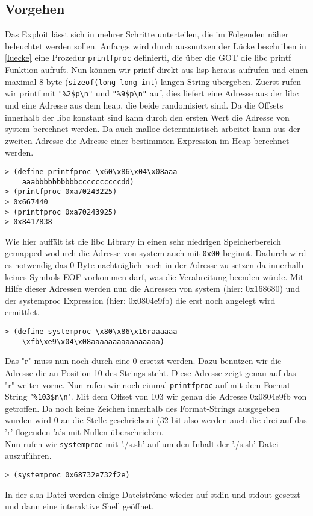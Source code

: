 \subsection{Vorgehen}
Das Exploit lässt sich in mehrer Schritte unterteilen, die im Folgenden näher beleuchtet werden sollen. Anfangs wird durch aussnutzen der Lücke beschriben in \ref{luecke} eine Prozedur \texttt{printfproc} definierti, die über die GOT die libc printf Funktion aufruft. Nun können wir printf direkt aus lisp heraus aufrufen und einen maximal 8 byte (\texttt{sizeof(long long int}) langen String übergeben.
 Zuerst rufen wir printf mit \texttt{"\%2\$p\textbackslash n"} und \texttt{"\%9\$p\textbackslash n"} auf, dies liefert eine Adresse aus der libc und eine Adresse aus dem heap, die beide randomisiert sind. 
Da die Offsets innerhalb der libc konstant sind kann durch den ersten Wert die Adresse von system berechnet werden. Da auch malloc deterministisch arbeitet kann aus der zweiten Adresse die Adresse einer bestimmten Expression im Heap berechnet werden.
\begin{lstlisting}
> (define printfproc \x60\x86\x04\x08aaa
	aaabbbbbbbbbbccccccccccdd)
> (printfproc 0xa70243225)
> 0x667440
> (printfproc 0xa70243925)
> 0x8417838
\end{lstlisting}
Wie hier auffält ist die libc Library in einen sehr niedrigen Speicherbereich gemapped wodurch die Adresse von system auch mit  \texttt{0x00} beginnt. Dadurch wird es notwendig das 0 Byte nachträglich noch in der Adresse zu setzen da innerhalb keines Symbols EOF vorkommen darf, was die Verabreitung beenden würde.
Mit Hilfe dieser Adressen werden nun die Adressen von system (hier: 0x168680) und der systemproc Expression (hier: 0x0804e9fb) die erst noch angelegt wird ermittlet.
\begin{lstlisting}
> (define systemproc \x80\x86\x16raaaaaa
	\xfb\xe9\x04\x08aaaaaaaaaaaaaaaa)
\end{lstlisting}
Das "r" muss nun noch durch eine 0 ersetzt werden. 
Dazu benutzen wir die Adresse die an Position 10 des Strings steht. 
Diese Adresse zeigt genau auf das "r" weiter vorne. 
Nun rufen wir noch einmal \texttt{printfproc} auf mit dem Format-String "\texttt{\%103\$n\textbackslash n}". Mit dem Offset von 103 wir genau die Adresse 0x0804e9fb von getroffen. Da noch keine Zeichen innerhalb des Format-Strings ausgegeben wurden wird 0 an die Stelle geschriebeni (32 bit also werden auch die drei auf das 'r' flogenden 'a's mit Nullen überschrieben.
\\
Nun rufen wir \texttt{systemproc} mit './s.sh' auf um den Inhalt der './s.sh' Datei auszuführen.
\begin{lstlisting}
> (systemproc 0x68732e732f2e)
\end{lstlisting}
In der s.sh Datei werden einige Dateiströme wieder auf stdin und stdout gesetzt und dann eine interaktive Shell geöffnet.
